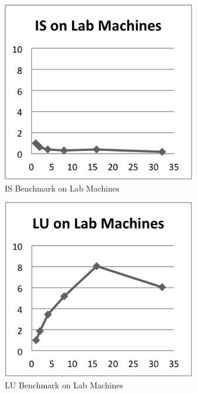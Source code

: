\documentclass{acm_proc_article-sp}
\begin{document}
\begin{figure}[tbp]
  \centering
  \caption{IS Benchmark on Lab Machines}
	\label{LabIS}
  \includegraphics[width=20pc]{Pics-Lab/IS.png}
\end{figure}

\begin{figure}[tbp]
  \centering
  \caption{LU Benchmark on Lab Machines}
	\label{LabLU}
  \includegraphics[width=20pc]{Pics-Lab/LU.png}
\end{figure}
\end{document}
